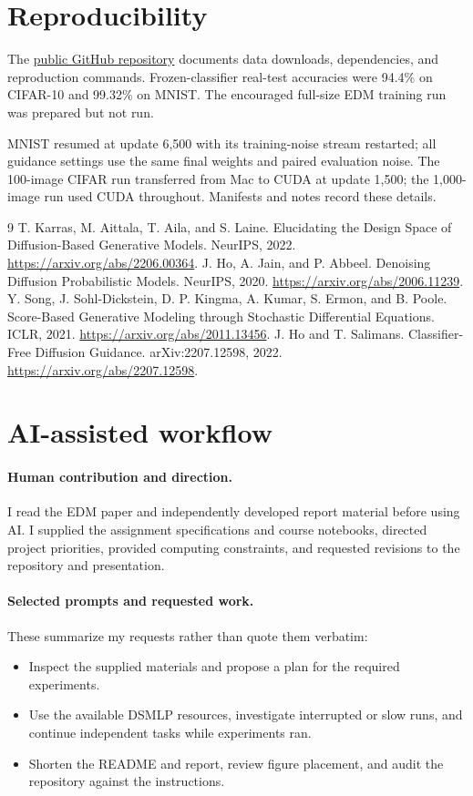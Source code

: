 \documentclass[11pt]{article}
\begin{document}
\section*{Reproducibility}
The \href{https://github.com/aathijmuthu/DSC-180A-Checkpoint}{public GitHub repository} documents data downloads, dependencies, and reproduction commands. Frozen-classifier real-test accuracies were 94.4\% on CIFAR-10 and 99.32\% on MNIST. The encouraged full-size EDM training run was prepared but not run.

MNIST resumed at update 6,500 with its training-noise stream restarted; all guidance settings use the same final weights and paired evaluation noise. The 100-image CIFAR run transferred from Mac to CUDA at update 1,500; the 1,000-image run used CUDA throughout. Manifests and notes record these details.

\begin{thebibliography}{9}
 T. Karras, M. Aittala, T. Aila, and S. Laine. Elucidating the Design Space of Diffusion-Based Generative Models. NeurIPS, 2022. \url{https://arxiv.org/abs/2206.00364}.
 J. Ho, A. Jain, and P. Abbeel. Denoising Diffusion Probabilistic Models. NeurIPS, 2020. \url{https://arxiv.org/abs/2006.11239}.
 Y. Song, J. Sohl-Dickstein, D. P. Kingma, A. Kumar, S. Ermon, and B. Poole. Score-Based Generative Modeling through Stochastic Differential Equations. ICLR, 2021. \url{https://arxiv.org/abs/2011.13456}.
 J. Ho and T. Salimans. Classifier-Free Diffusion Guidance. arXiv:2207.12598, 2022. \url{https://arxiv.org/abs/2207.12598}.
\end{thebibliography}
\clearpage
\appendix
\section{AI-assisted workflow}
\paragraph{Human contribution and direction.}
I read the EDM paper and independently developed report material before using AI. I supplied the assignment specifications and course notebooks, directed project priorities, provided computing constraints, and requested revisions to the repository and presentation.

\paragraph{Selected prompts and requested work.}
These summarize my requests rather than quote them verbatim:
\begin{itemize}
\item Inspect the supplied materials and propose a plan for the required experiments.
\item Use the available DSMLP resources, investigate interrupted or slow runs, and continue independent tasks while experiments ran.
\item Shorten the README and report, review figure placement, and audit the repository against the instructions.
\end{itemize}
\end{document}
